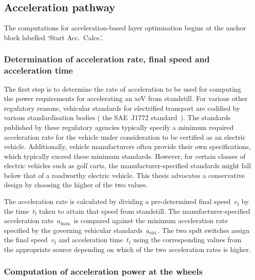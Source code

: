 \subsection{Acceleration pathway}\label{sec:accpathway}

The computations for acceleration-based layer  optimisation begins at the anchor
block labelled `Start Acc.\ Calcs.'.

\subsubsection*{Determination of acceleration rate, final speed and acceleration time}

The  first  step is  to  determine  the rate  of  acceleration  to be  used  for
computing the power requirements for  accelerating an \gls{xeV} from standstill.
For  various  other  regulatory  reasons, vehicular  standards  for  electrified
transport are  codified by various  standardisation bodies (\eg{}  the SAE~J1772
standard~\cite{Sae2010}). The  standards published by these  regulatory agencies
typically specify  a minimum  required acceleration rate  for the  vehicle under
consideration  to be  certified as  an electric  vehicle. Additionally,  vehicle
manufacturers  often provide  their own  specifications, which  typically exceed
these minimum standards. However, for  certain classes of electric vehicles such
as golf carts,  the manufacturer-specified standards might fall below  that of a
roadworthy  electric vehicle.  This thesis  advocates a  conservative design  by
choosing the higher of the two values.

The  acceleration  rate  is  calculated   by  dividing  a  pre-determined  final
speed~$v_\text{f}$  by the  time~$t_\text{f}$ taken  to attain  that speed  from
standstill.  The  manufacturer-specified  acceleration  rate~$a_\text{man.}$  is
compared  against  the minimum  acceleration  rate  specified by  the  governing
vehicular   standards~$a_\text{std.}$.  The   two  \gls{spdt}   switches  assign
the  final  speed~$v_\text{f}$  and  acceleration  time~$t_\text{f}$  using  the
corresponding values from  the appropriate source depending on which  of the two
acceleration rates is higher.

\subsubsection*{Computation of acceleration power at the wheels}

